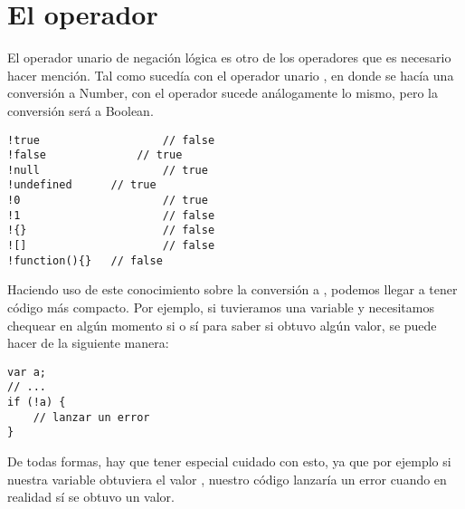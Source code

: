 \section{El operador \code{!}}
\label{sec:operadornegacion}

El operador unario de negación lógica es otro de los operadores que es necesario hacer mención. Tal como sucedía con el operador unario \code{+}, en donde se hacía una conversión a Number, con el operador \code{!} sucede análogamente lo mismo, pero la conversión será a Boolean. 

\begin{lstlisting}[title={Operador \code{!} con diferentes valores}]
!true					// false
!false				// true
!null					// true
!undefined		// true
!0						// true
!1						// false
!{}						// false
![]						// false
!function(){}	// false
\end{lstlisting}

Haciendo uso de este conocimiento sobre la conversión a , podemos llegar a tener código más compacto. Por ejemplo, si tuvieramos una variable  y necesitamos chequear en algún momento si  o sí  para saber si  obtuvo algún valor, se puede hacer de la siguiente manera:

\begin{lstlisting}
var a;
// ...
if (!a) {
	// lanzar un error
}
\end{lstlisting}

De todas formas, hay que tener especial cuidado con esto, ya que por ejemplo si nuestra variable  obtuviera el valor , nuestro código lanzaría un error cuando en realidad sí se obtuvo un valor.